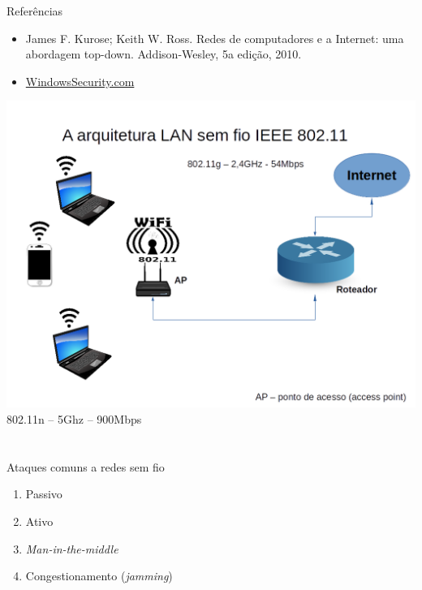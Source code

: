 
\lecturetitle{\course}{\insertlecture}

\frame{\maketitle}

\begin{frame}{Referências}
  
  \begin{itemize}
  \item James F. Kurose; Keith W. Ross. Redes de computadores e a
    Internet: uma abordagem top-down. Addison-Wesley, 5a edição,
    2010.
  \item \href{http://www.windowsecurity.com/}{WindowsSecurity.com}
  \end{itemize}
\end{frame}

\begin{frame}{}
  \includegraphics[scale=.39]{img/wifi.png}
  {\scriptsize 802.11n --	5Ghz -- 900Mbps}
\end{frame}

\section{\insertlecture}

\begin{frame}{Ataques comuns a redes sem fio}
  \large

  \begin{enumerate}[<+->]
  \item Passivo
  \item Ativo
  \item {\em Man-in-the-middle}
  \item Congestionamento ({\em jamming})
  \end{enumerate}
  
\end{frame}

